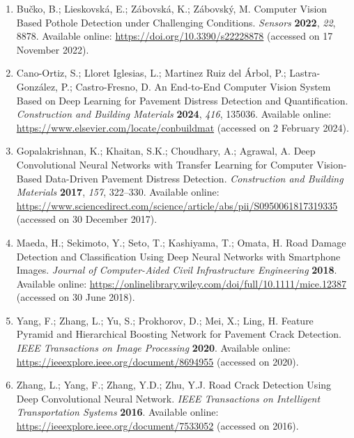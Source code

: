 \documentclass[12pt,a4paper]{article}
\begin{document}
\begin{thebibliography}{99}
\begin{enumerate}
    \item Bučko, B.; Lieskovská, E.; Zábovská, K.; Zábovský, M. Computer Vision Based Pothole Detection under Challenging Conditions. \textit{Sensors} \textbf{2022}, \textit{22}, 8878.  
    Available online: \url{https://doi.org/10.3390/s22228878} (accessed on 17 November 2022).

    \item Cano-Ortiz, S.; Lloret Iglesias, L.; Martinez Ruiz del Árbol, P.; Lastra-González, P.; Castro-Fresno, D. An End-to-End Computer Vision System Based on Deep Learning for Pavement Distress Detection and Quantification. \textit{Construction and Building Materials} \textbf{2024}, \textit{416}, 135036.  
    Available online: \url{https://www.elsevier.com/locate/conbuildmat} (accessed on 2 February 2024).
    
    \item Gopalakrishnan, K.; Khaitan, S.K.; Choudhary, A.; Agrawal, A. Deep Convolutional Neural Networks with Transfer Learning for Computer Vision-Based Data-Driven Pavement Distress Detection. \textit{Construction and Building Materials} \textbf{2017}, \textit{157}, 322–330.  
    Available online: \url{https://www.sciencedirect.com/science/article/abs/pii/S0950061817319335} (accessed on 30 December 2017).
    
    \item Maeda, H.; Sekimoto, Y.; Seto, T.; Kashiyama, T.; Omata, H. Road Damage Detection and Classification Using Deep Neural Networks with Smartphone Images. \textit{Journal of Computer-Aided Civil Infrastructure Engineering} \textbf{2018}.  
    Available online: \url{https://onlinelibrary.wiley.com/doi/full/10.1111/mice.12387} (accessed on 30 June 2018).
    
    \item Yang, F.; Zhang, L.; Yu, S.; Prokhorov, D.; Mei, X.; Ling, H. Feature Pyramid and Hierarchical Boosting Network for Pavement Crack Detection. \textit{IEEE Transactions on Image Processing} \textbf{2020}.  
    Available online: \url{https://ieeexplore.ieee.org/document/8694955} (accessed on 2020).
    
    \item Zhang, L.; Yang, F.; Zhang, Y.D.; Zhu, Y.J. Road Crack Detection Using Deep Convolutional Neural Network. \textit{IEEE Transactions on Intelligent Transportation Systems} \textbf{2016}.  
    Available online: \url{https://ieeexplore.ieee.org/document/7533052} (accessed on 2016).
    

\end{enumerate}
\end{thebibliography}
\end{document}
